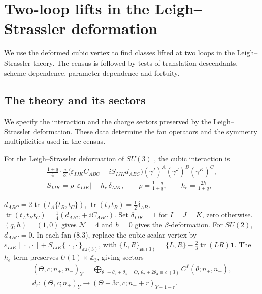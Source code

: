 \documentclass[11pt]{article}
\numberwithin{equation}{section}
\numberwithin{figure}{section}
\numberwithin{table}{section}
\begin{document}
\section{Two-loop lifts in the Leigh--Strassler deformation}\label{sec-E-LS}

We use the deformed cubic vertex to find classes lifted at two loops in the Leigh--Strassler theory. The census is followed by tests of translation descendants, scheme dependence, parameter dependence and fortuity.

\subsection{The theory and its sectors}\label{sec-E-LS-setup}

We specify the interaction and the charge sectors preserved by the Leigh--Strassler deformation. These data determine the fan operators and the symmetry multiplicities used in the census.

For the Leigh--Strassler deformation of $SU(3)$ \cite{LeighStrassler}, the cubic interaction is
\begin{equation}\label{eq-E-LS}
\begin{gathered}\frac{1+q}4\cdot\frac i{3!}\bigl(\varepsilon_{IJK}C_{ABC}-iS_{IJK}d_{ABC}\bigr)(\gamma^I)^A(\gamma^J)^B(\gamma^K)^C,\\ S_{IJK}=\rho\,|\varepsilon_{IJK}|+h_e\,\delta_{IJK},\qquad \rho=\frac{1-q}{1+q},\qquad h_e=\frac{2h}{1+q},\end{gathered}
\end{equation}

$d_{ABC}=2\operatorname{tr}(t_A\{t_B,t_C\})$, $\operatorname{tr}(t_At_B)=\tfrac12\delta_{AB}$, $\operatorname{tr}(t_At_Bt_C)=\tfrac14(d_{ABC}+iC_{ABC})$. Set $\delta_{IJK}=1$ for $I=J=K$, zero otherwise. $(q,h)=(1,0)$ gives $\mathcal N=4$ and $h=0$ gives the $\beta$-deformation. For $SU(2)$, $d_{ABC}=0$. In each fan (8.3), replace the cubic scalar vertex by $\varepsilon_{IJK}[\,\cdot\,,\cdot\,]+S_{IJK}\{\,\cdot\,,\cdot\,\}_{\mathfrak{su}(3)}$, with $\{L,R\}_{\mathfrak{su}(3)}=\{L,R\}-\tfrac23\operatorname{tr}(LR)\mathbf1$. The $h_e$ term preserves $U(1)\times\mathbb Z_3$, giving sectors
\begin{equation}\label{eq-E-LS-sector}
\begin{gathered}(\Theta,c;n_+,n_-)_Y=\bigoplus_{\theta_1+\theta_2+\theta_3=\Theta,\ \theta_2+2\theta_3\equiv c\ (3)}C^Y(\theta;n_+,n_-),\\ d_r:(\Theta,c;n_\pm)_Y\to(\Theta-3r,c;n_\pm+r)_{Y+1-r}.\end{gathered}
\end{equation}
\end{document}

